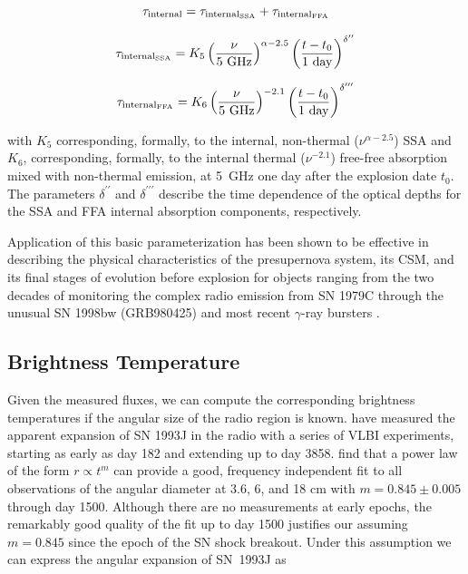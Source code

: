 \documentclass[12pt,preprint]{aastex}
\begin{document}
\begin{equation}
\label{eq9}
\tau_{\rm internal}  = \tau_{\rm internal_{\rm SSA}} + \tau_{\rm internal_{\rm FFA}}
\end{equation}

\begin{equation}
\label{eq10}
\tau_{\rm internal_{\rm SSA}} = K_5\left(\frac{\nu}{\mbox{5\
GHz}}\right)^{\alpha-2.5}  \left(\frac{t-t_0}{\mbox{1\
day}}\right)^{\delta^{\prime\prime}}
\end{equation}

\begin{equation}
\label{eq11}
\tau_{\rm internal_{\rm FFA}}  =   K_6  \left(\frac{\nu}{\mbox{5\
GHz}}\right)^{-2.1} \left(\frac{t-t_0}{\mbox{1\
day}}\right)^{\delta^{\prime\prime\prime}}
\end{equation}

\noindent with $K_5$ corresponding, formally, to the internal,
non-thermal ($\nu^{\alpha - 2.5}$) SSA and $K_6$, corresponding, formally,
to the internal thermal ($\nu^{-2.1}$) free-free absorption mixed with
non-thermal emission, at 5~GHz one day after the explosion date $t_0$. 
The parameters $\delta^{\prime \prime}$ and $\delta^{\prime \prime
\prime}$ describe the time dependence of the optical depths for the SSA
and FFA internal absorption components, respectively. 

Application of this basic parameterization has been shown to be effective
in describing the physical characteristics of the presupernova system,
its CSM, and its final stages of evolution before explosion for objects
ranging from the two decades of monitoring the complex radio emission
from SN 1979C \citep{Montes00} through the unusual SN 1998bw (GRB980425)
\citep{Weiler01} and most recent $\gamma$-ray bursters
\citep{Weiler02,Weiler03}.

\subsection{Brightness Temperature}

Given the measured fluxes, we can compute the corresponding brightness
temperatures if the angular size of the radio region is known.  \cite{Marcaide95a,Marcaide95b,Marcaide97,Marcaide05,Marcaide07} have measured the apparent expansion of SN 1993J in the radio with a series of VLBI experiments, starting as early
as day 182 and extending up to day 3858.  \cite{Marcaide07} find
that a power law of the form $r \propto t^m$ can provide a good, frequency independent fit to all observations of the angular diameter at 3.6, 6, and 18 cm with $m = 0.845 \pm 0.005$
through day 1500. Although there are no measurements at early epochs,
the remarkably good quality of the fit up to day 1500 justifies our assuming $m = 0.845$ since the epoch of the SN shock breakout.  Under this assumption we can express the angular expansion of SN~1993J as
\end{document}
